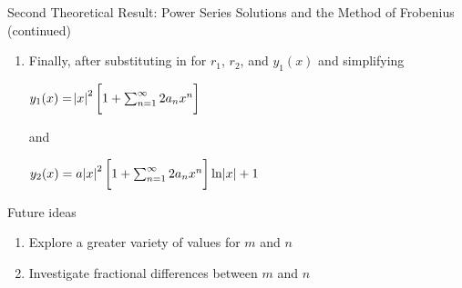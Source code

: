 \documentclass{beamer}
\begin{document}
\begin{frame}{Second Theoretical Result: Power Series Solutions and the Method of Frobenius (continued)}

\vspace*{-15mm}

\begin{enumerate}

\suite

\item Finally, after substituting in for $r_{1}$, $r_{2}$, and $y_{1}(x)$ and simplifying

\begin{center}

\begin{minipage}{5cm}

\begin{varblock}[5cm]

$y_{1}(x)=\abs{x}^{2} \bigg[1 + \sum_{n=1}^{\infty} 2a_{n}x^n\bigg]$

\end{varblock}

\end{minipage}

\end{center}

and

\begin{center}

\begin{minipage}{7cm}

\begin{varblock}[7cm]

$y_{2}(x)=a \abs{x}^{2} \bigg[1 + \sum_{n=1}^{\infty} 2a_{n}x^n\bigg] \ln{\abs{x}} + 1$

\end{varblock}

\end{minipage}

\end{center}

\end{enumerate}

\end{frame}

\begin{frame}{Future ideas}

\begin{enumerate}

\vspace*{-40mm}

\item Explore a greater variety of values for $m$ and $n$

\item Investigate fractional differences between $m$ and $n$

\end{enumerate}

\end{frame}
\end{document}
